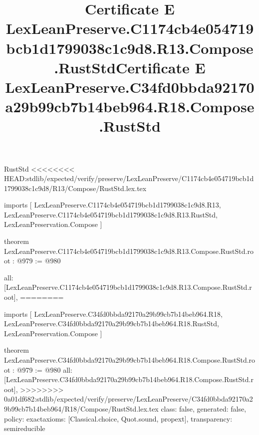 \begin{lexlean}{RustStd}
<<<<<<<< HEAD:stdlib/expected/verify/preserve/LexLeanPreserve/C1174cb4e054719bcb1d1799038c1c9d8/R13/Compose/RustStd.lex.tex
\title{Certificate E LexLeanPreserve.C1174cb4e054719bcb1d1799038c1c9d8.R13.Compose.RustStd}
\begin{coremodule}
imports [
  LexLeanPreserve.C1174cb4e054719bcb1d1799038c1c9d8.R13,
  LexLeanPreserve.C1174cb4e054719bcb1d1799038c1c9d8.R13.RustStd,
  LexLeanPreservation.Compose
]

theorem LexLeanPreserve.C1174cb4e054719bcb1d1799038c1c9d8.R13.Compose.RustStd.root : @979 := @980 {
  all: [LexLeanPreserve.C1174cb4e054719bcb1d1799038c1c9d8.R13.Compose.RustStd.root],
========
\title{Certificate E LexLeanPreserve.C34fd0bbda92170a29b99cb7b14beb964.R18.Compose.RustStd}
\begin{coremodule}
imports [
  LexLeanPreserve.C34fd0bbda92170a29b99cb7b14beb964.R18,
  LexLeanPreserve.C34fd0bbda92170a29b99cb7b14beb964.R18.RustStd,
  LexLeanPreservation.Compose
]

theorem LexLeanPreserve.C34fd0bbda92170a29b99cb7b14beb964.R18.Compose.RustStd.root : @979 := @980 {
  all: [LexLeanPreserve.C34fd0bbda92170a29b99cb7b14beb964.R18.Compose.RustStd.root],
>>>>>>>> 0a01df682:stdlib/expected/verify/preserve/LexLeanPreserve/C34fd0bbda92170a29b99cb7b14beb964/R18/Compose/RustStd.lex.tex
  class: false,
  generated: false,
  policy: exact{axioms: [Classical.choice, Quot.sound, propext]},
  transparency: semireducible
}


\end{coremodule}}
\end{coremodule}
\end{lexlean}

